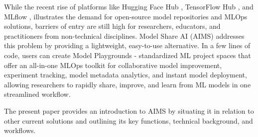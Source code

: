 While the recent rise of platforms like Hugging Face Hub \citep{noauthor_hugging_2023}, TensorFlow Hub \citep{noauthor_tensorflow_2023}, and MLflow \citep{noauthor_mlflow_2023,chen_developments_2020, zaharia_accelerating_2018}, illustrates the demand for open-source model repositories and MLOps solutions, barriers of entry are still high for researchers, educators, and practitioners from non-technical disciplines. Model Share AI (AIMS) addresses this problem by providing a lightweight, easy-to-use alternative. In a few lines of code, users can create Model Playgrounds - standardized ML project spaces that offer an all-in-one MLOps toolkit for collaborative model improvement, experiment tracking, model metadata analytics, and instant model deployment, allowing researchers to rapidly share, improve, and learn from ML models in one streamlined workflow.

The present paper provides an introduction to AIMS by situating it in relation to other current solutions and outlining its key functions, technical background, and workflows. 


